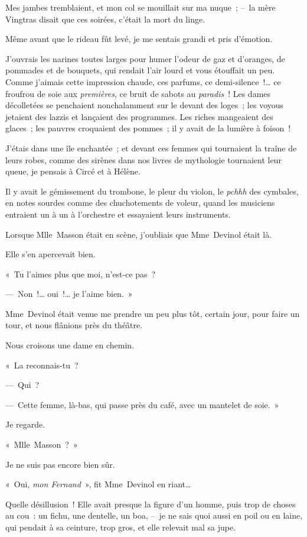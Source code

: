 \documentclass[french,twoside]{book} %
\begin{document}
\noindent Mes jambes tremblaient, et mon col se mouillait sur ma nuque ; – la mère Vingtras disait que ces soirées, c’était la mort du linge.\par
Même avant que le rideau fût levé, je me sentais grandi et pris d’émotion.\par
J’ouvrais les narines toutes larges pour humer l’odeur de gaz et d’oranges, de pommades et de bouquets, qui rendait l’air lourd et vous étouffait un peu. Comme j’aimais cette impression chaude, ces parfums, ce demi-silence !… ce froufrou de soie aux \emph{premières}, ce bruit de sabots au \emph{paradis} ! Les dames décolletées se penchaient nonchalamment sur le devant des loges ; les voyous jetaient des lazzis et lançaient des programmes. Les riches mangeaient des glaces ; les pauvres croquaient des pommes ; il y avait de la lumière à foison !\par
J’étais dans une île enchantée ; et devant ces femmes qui tournaient la traîne de leurs robes, comme des sirènes dans nos livres de mythologie tournaient leur queue, je pensais à Circé et à Hélène.\par
Il y avait le gémissement du trombone, le pleur du violon, le \emph{pchhh} des cymbales, en notes sourdes comme des chuchotements de voleur, quand les musiciens entraient un à un à l’orchestre et essayaient leurs instruments.\par
\bigbreak
\noindent Lorsque Mlle Masson était en scène, j’oubliais que Mme Devinol était là.\par
Elle s’en apercevait bien.\par
« Tu l’aimes plus que moi, n’est-ce pas ?\par
— Non !… oui !… je l’aime bien. »\par
\bigbreak
\noindent Mme Devinol était venue me prendre un peu plus tôt, certain jour, pour faire un tour, et nous flânions près du théâtre.\par
Nous croisons une dame en chemin.\par
« La reconnais-tu ?\par
— Qui ?\par
— Cette femme, là-bas, qui passe près du café, avec un mantelet de soie. »\par
Je regarde.\par
« Mlle Masson ? »\par
Je ne suis pas encore bien sûr.\par
« Oui, \emph{mon Fernand} », fit Mme Devinol en riant…\par
Quelle désillusion ! Elle avait presque la figure d’un homme, puis trop de choses au cou : un fichu, une dentelle, un boa, – je ne sais quoi aussi en poil ou en laine, qui pendait à sa ceinture, trop gros, et elle relevait mal sa jupe.\par
\end{document}

